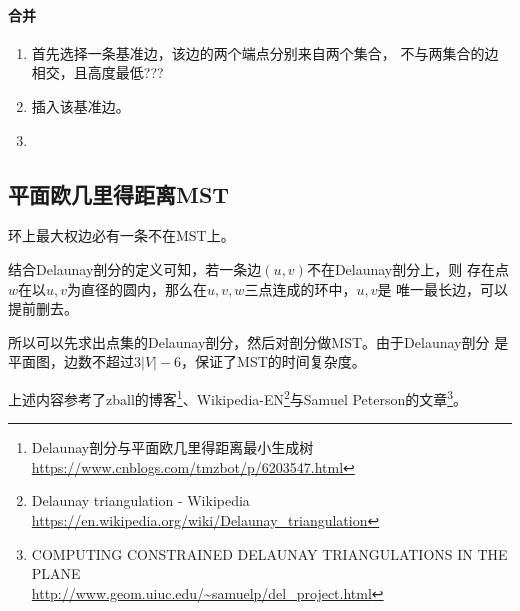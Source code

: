 \paragraph{合并}
\begin{enumerate}
    \item 首先选择一条基准边，该边的两个端点分别来自两个集合，
    不与两集合的边相交，且高度最低???
    \item 插入该基准边。
    \item
\end{enumerate}


\subsection{平面欧几里得距离MST}
\begin{property}
    环上最大权边必有一条不在MST上。
\end{property}

结合Delaunay剖分的定义可知，若一条边$(u,v)$不在Delaunay剖分上，则
存在点$w$在以$u,v$为直径的圆内，那么在$u,v,w$三点连成的环中，$u,v$是
唯一最长边，可以提前删去。

所以可以先求出点集的Delaunay剖分，然后对剖分做MST。由于Delaunay剖分
是平面图，边数不超过$3|V|-6$，保证了MST的时间复杂度。

上述内容参考了zball的博客\footnote{
    Delaunay剖分与平面欧几里得距离最小生成树\\
    \url{https://www.cnblogs.com/tmzbot/p/6203547.html}
}、Wikipedia-EN\footnote{
    Delaunay triangulation - Wikipedia\\
\url{https://en.wikipedia.org/wiki/Delaunay\_triangulation}
}与Samuel Peterson的文章\footnote{
    COMPUTING CONSTRAINED DELAUNAY TRIANGULATIONS IN THE PLANE\\
    \url{http://www.geom.uiuc.edu/\~samuelp/del\_project.html}
}。
